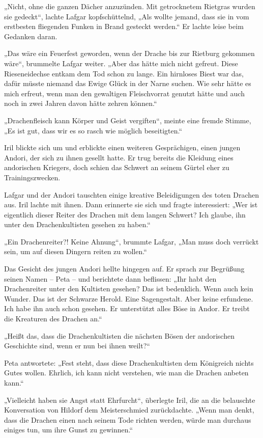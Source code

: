 „Nicht, ohne die ganzen Dächer anzuzünden. Mit getrocknetem Rietgras wurden sie gedeckt“, lachte Lafgar kopfschüttelnd, „Als wollte jemand, dass sie in vom erstbesten fliegenden Funken in Brand gesteckt werden.“ Er lachte leise beim Gedanken daran.

„Das wäre ein Feuerfest geworden, wenn der Drache bis zur Rietburg gekommen wäre“, brummelte Lafgar weiter. „Aber das hätte mich nicht gefreut. Diese Rieseneidechse entkam dem Tod schon zu lange. Ein hirnloses Biest war das, dafür müsste niemand das Ewige Glück in der Narne suchen. Wie sehr hätte es mich erfreut, wenn man den gewaltigen Fleischvorrat genutzt hätte und auch noch in zwei Jahren davon hätte zehren können.“

„Drachenfleisch kann Körper und Geist vergiften“, meinte eine fremde Stimme, „Es ist gut, dass wir es so rasch wie möglich beseitigten.“

Iril blickte sich um und erblickte einen weiteren Gesprächigen, einen jungen Andori, der sich zu ihnen gesellt hatte. Er trug bereits die Kleidung eines andorischen Kriegers, doch schien das Schwert an seinem Gürtel eher zu Trainingszwecken.

Lafgar und der Andori tauschten einige kreative Beleidigungen des toten Drachen aus. Iril lachte mit ihnen. Dann erinnerte sie sich und fragte interessiert: „Wer ist eigentlich dieser Reiter des Drachen mit dem langen Schwert? Ich glaube, ihn unter den Drachenkultisten gesehen zu haben.“

„Ein Drachenreiter?! Keine Ahnung“, brummte Lafgar, „Man muss doch verrückt sein, um auf diesen Dingern reiten zu wollen.“

Das Gesicht des jungen Andori hellte hingegen auf. Er sprach zur Begrüßung seinen Namen – Peta – und berichtete dann beflissen: „Ihr habt den Drachenreiter unter den Kultisten gesehen? Das ist bedenklich. Wenn auch kein Wunder. Das ist der Schwarze Herold. Eine Sagengestalt. Aber keine erfundene. Ich habe ihn auch schon gesehen. Er unterstützt alles Böse in Andor. Er treibt die Kreaturen des Drachen an.“

„Heißt das, dass die Drachenkultisten die nächsten Bösen der andorischen Geschichte sind, wenn er nun bei ihnen weilt?“

Peta antwortete: „Fest steht, dass diese Drachenkultisten dem Königreich nichts Gutes wollen. Ehrlich, ich kann nicht verstehen, wie man die Drachen anbeten kann.“

„Vielleicht haben sie Angst statt Ehrfurcht“, überlegte Iril, die an die belauschte Konversation von Hildorf dem Meisterschmied zurückdachte. „Wenn man denkt, dass die Drachen einen nach seinem Tode richten werden, würde man durchaus einiges tun, um ihre Gunst zu gewinnen.“

